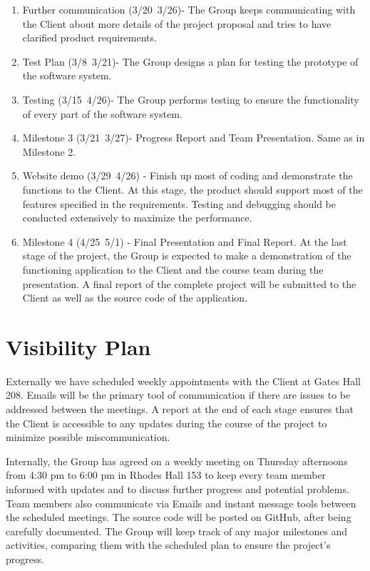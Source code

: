 \documentclass{article}
\begin{document}
\begin{enumerate}[I]
    \item Further communication (3/20~3/26)-  The Group keeps communicating with the Client about more details of the project proposal and tries to have clarified product requirements.
    \item Test Plan (3/8~3/21)- The Group designs a plan for testing the prototype of the software system.
    \item Testing (3/15~4/26)- The Group performs testing to ensure the functionality of every part of the software system.
    \item Milestone 3 (3/21~3/27)- Progress Report and Team Presentation. Same as in Milestone 2.
    \item Website demo (3/29~4/26) - Finish up most of coding and demonstrate the functions to the Client. At this stage, the product should support most of the features specified in the requirements. Testing and debugging should be conducted extensively to maximize the performance.
    \item Milestone 4 (4/25~5/1) - Final Presentation and Final Report. At the last stage of the project, the Group is expected to make a demonstration of the functioning application to the Client and the course team during the presentation. A final report of the complete project will be submitted to the Client as well as the source code of the application.
\end{enumerate}
\section{Visibility Plan}
Externally we have scheduled weekly appointments with the Client at Gates Hall 208. Emails will be the primary tool of communication if there are issues to be addressed between the meetings. A report at the end of each stage ensures that the Client is accessible to any updates during the course of the project to minimize possible miscommunication.

\vspace{0.4cm}Internally, the Group has agreed on a weekly meeting on Thursday afternoons from 4:30 pm to 6:00 pm in Rhodes Hall 153 to keep every team member informed with updates and to discuss further progress and potential problems. Team members also communicate via Emails and instant message tools between the scheduled meetings. The source code will be posted on GitHub, after being carefully documented. The Group will keep track of any major milestones and activities, comparing them with the scheduled plan to ensure the project’s progress.
\end{document}
